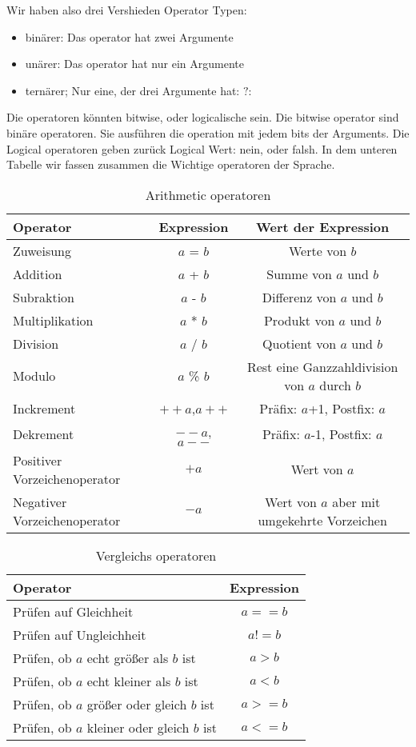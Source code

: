 \documentclass{article}[12pt]
\begin{document}
Wir haben also drei Vershieden Operator Typen:
\begin{itemize}
\item binärer: Das operator hat zwei Argumente
\item unärer: Das operator hat nur ein Argumente
\item ternärer; Nur eine, der drei Argumente hat: $?:$
\end{itemize} 

Die operatoren könnten bitwise, oder logicalische sein. Die bitwise operator sind binäre operatoren. Sie ausführen die operation mit jedem bits der Arguments.
Die Logical operatoren geben zurück Logical Wert: nein, oder falsh. In dem unteren Tabelle wir fassen zusammen die Wichtige operatoren der Sprache.

\begin{table}
\caption{Arithmetic operatoren \label{oper}}
\centering
\begin{tabular}{|l c c|}
\hline
Operator & Expression & Wert der Expression \\
\hline
Zuweisung & $a$ = $b$ & Werte von $b$ \\
Addition & $a$ + $b$ & Summe von $a$ und $b$ \\
Subraktion & $a$ - $b$ & Differenz von $a$ und $b$ \\
Multiplikation & $a$ * $b$ & Produkt von $a$ und $b$ \\
Division & $a$ / $b$ & Quotient von $a$ und $b$ \\
Modulo & $a$ \% $b$ & Rest eine Ganzzahldivision von $a$ durch $b$ \\
Inckrement & $++a$,$a++$ & Präfix: $a$+1, Postfix: $a$ \\
Dekrement & $--a$, $a--$ & Präfix: $a$-1, Postfix: $a$ \\
Positiver Vorzeichenoperator & $+a$ & Wert von $a$ \\
Negativer Vorzeichenoperator & $-a$ & Wert von $a$ aber mit umgekehrte Vorzeichen \\
\hline
\end{tabular}
\end{table}

\begin{table}
\caption{Vergleichs operatoren \label{vergoper}}
\centering
\begin{tabular}{|l c|}
\hline
Operator & Expression \\
\hline
Prüfen auf Gleichheit & $a == b$  \\
Prüfen auf Ungleichheit & $a != b$ \\
Prüfen, ob $a$ echt größer als $b$ ist & $a>b$ \\
Prüfen, ob $a$ echt kleiner als $b$ ist & $a<b$ \\
Prüfen, ob $a$ größer oder gleich $b$ ist & $a>=b$ \\
Prüfen, ob $a$ kleiner oder gleich $b$ ist & $a<=b$ \\
\hline
\end{tabular}
\end{table}
\end{document}
